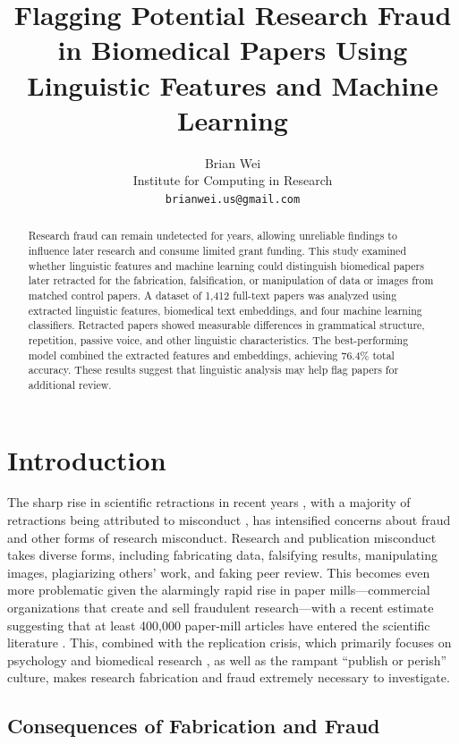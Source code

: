 \documentclass[11pt,letterpaper]{article}
\title{Flagging Potential Research Fraud in Biomedical Papers Using Linguistic Features and Machine Learning}
\author{Brian Wei \\
        Institute for Computing in Research \\
        {\tt brianwei.us@gmail.com}}
\date{}
\begin{document}
\maketitle

\begin{abstract}
Research fraud can remain undetected for years, allowing unreliable findings to influence later research and consume limited grant funding. This study examined whether linguistic features and machine learning could distinguish biomedical papers later retracted for the fabrication, falsification, or manipulation of data or images from matched control papers. A dataset of 1,412 full-text papers was analyzed using extracted linguistic features, biomedical text embeddings, and four machine learning classifiers. Retracted papers showed measurable differences in grammatical structure, repetition, passive voice, and other linguistic characteristics. The best-performing model combined the extracted features and embeddings, achieving 76.4\% total accuracy. These results suggest that linguistic analysis may help flag papers for additional review.
\end{abstract}

\section{Introduction}

The sharp rise in scientific retractions in recent years \cite{citation_needed_retraction_growth}, with a majority of retractions being attributed to misconduct \cite{citation_needed_misconduct_share}, has intensified concerns about fraud and other forms of research misconduct. Research and publication misconduct takes diverse forms, including fabricating data, falsifying results, manipulating images, plagiarizing others' work, and faking peer review. This becomes even more problematic given the alarmingly rapid rise in paper mills---commercial organizations that create and sell fraudulent research---with a recent estimate suggesting that at least 400,000 paper-mill articles have entered the scientific literature \cite{paper_mills_estimate}. This, combined with the replication crisis, which primarily focuses on psychology and biomedical research \cite{openscience2015,begley2012}, as well as the rampant ``publish or perish'' culture, makes research fabrication and fraud extremely necessary to investigate.

\subsection{Consequences of Fabrication and Fraud}
\end{document}

